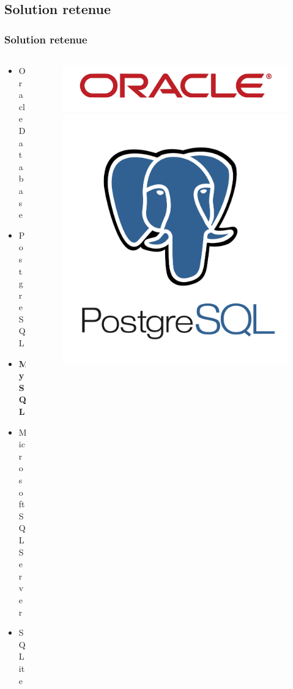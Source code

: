 \subsection[Solution retenue]{Solution retenue}
\begin{frame}
\frametitle{Solution retenue}
\begin{columns}
\begin{column}{5cm}
\begin{itemize}
	\item Oracle Database
	\item PostgreSQL
	\item \textbf{MySQL}
	\item Microsoft SQL Server
	\item SQLite
\end{itemize}
\end{column}
\begin{column}{7cm}
\begin{figure}
\includegraphics[scale=0.038]{Images/Oracle}
\includegraphics[scale=0.18]{Images/PostgreSQL}\\

\end{figure}
\end{column}
\end{columns}
\end{frame}
